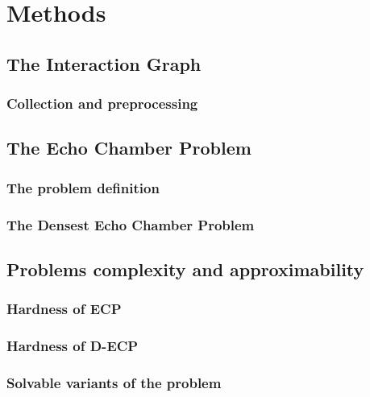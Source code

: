 \chapter{Methods}
\label{ch:methods}

\section{The Interaction Graph}
\label{sec:dataCollection}

\subsection{Collection and preprocessing}%
\label{sub:collection_and_preprocessing}


\section{The Echo Chamber Problem}%
\label{sec:the_echo_chamber_problem}

\subsection{The problem definition}%
\label{sub:the_problem_definition}

\subsection{The Densest Echo Chamber Problem}%
\label{sub:the_densest_echo_chamber_problem}

\section{Problems complexity and approximability}%
\label{sec:problem_complexity_and_approximability}

\subsection{Hardness of ECP}%
\label{sub:ecp_is_}

\subsection{Hardness of D-ECP}%
\label{sub:ecp_is_}

\subsection{Solvable variants of the problem}%
\label{sub:solvable_variants_of_the_problem}

